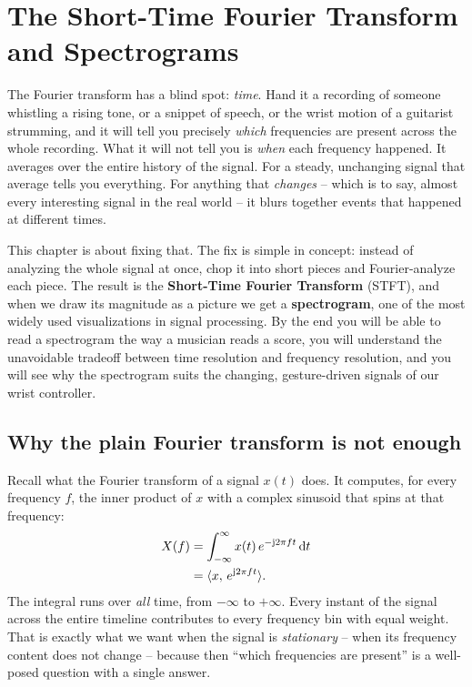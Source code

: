 \chapter{The Short-Time Fourier Transform and Spectrograms}

The Fourier transform has a blind spot: \emph{time}. Hand it a recording of someone whistling a rising
tone, or a snippet of speech, or the wrist motion of a guitarist strumming, and
it will tell you precisely \emph{which} frequencies are present across the whole
recording. What it will not tell you is \emph{when} each frequency happened. It
averages over the entire history of the signal. For a steady, unchanging signal
that average tells you everything. For anything that \emph{changes} -- which is
to say, almost every interesting signal in the real world -- it blurs together
events that happened at different times.

This chapter is about fixing that. The fix is simple in
concept: instead of analyzing the whole signal at once, chop it into short
pieces and Fourier-analyze each piece. The result is the
\textbf{Short-Time Fourier Transform} (STFT), and when we draw its magnitude as
a picture we get a \textbf{spectrogram}, one of the most widely used
visualizations in signal processing. By the end you will be able to read a
spectrogram the way a musician reads a score, you will understand the unavoidable
tradeoff between time resolution and frequency resolution, and you will see why
the spectrogram suits the changing, gesture-driven signals of our wrist
controller.

\chapterline

\section{Why the plain Fourier transform is not enough}
\label{ch10:why-not-enough}

Recall what the Fourier transform of a signal $x(t)$ does. It computes, for every
frequency $f$, the inner product of $x$ with a complex sinusoid that spins at
that frequency:
\begin{align}
\label{ch10:ft-defn}
\begin{split}
X(f) &= \int_{-\infty}^{\infty} x(t)\, e^{-\mathrm{j} 2\pi f t}\,\mathrm{d} t \\
     &= \langle x,\, e^{\mathrm{j} 2\pi f t} \rangle.
\end{split}
\end{align}
The integral runs over \emph{all} time, from $-\infty$ to $+\infty$. Every
instant of the signal across the entire timeline contributes to every frequency bin
with equal weight. That is exactly what we want when the signal is
\emph{stationary} -- when its frequency content does not change -- because then
``which frequencies are present'' is a well-posed question with a single answer.

